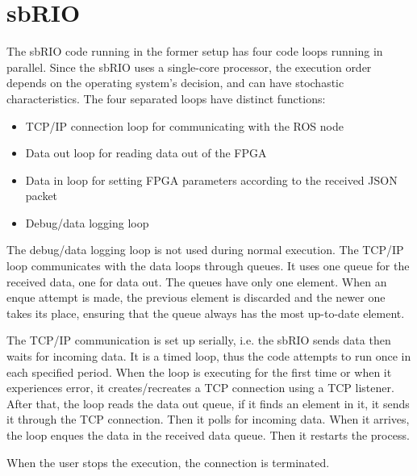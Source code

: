 \section{sbRIO}\label{sec:sbrio}

The sbRIO code running in the former setup has four code loops running in parallel. Since the sbRIO uses a single-core processor, the execution order depends on the operating system's decision, and can have stochastic characteristics. The four separated loops have distinct functions:

\begin{itemize}
	\item TCP/IP connection loop for communicating with the ROS node
	\item Data out loop for reading data out of the FPGA
	\item Data in loop for setting FPGA parameters according to the received JSON packet
	\item Debug/data logging loop
\end{itemize}

The debug/data logging loop is not used during normal execution. The TCP/IP loop communicates with the data loops through queues. It uses one queue for the received data, one for data out. The queues have only one element. When an enque attempt is made, the previous element is discarded and the newer one takes its place, ensuring that the queue always has the most up-to-date element.

The TCP/IP communication is set up serially, i.e. the sbRIO sends data then waits for incoming data. It is a timed loop, thus the code attempts to run once in each specified period. When the loop is executing for the first time or when it experiences error, it creates/recreates a TCP connection using a TCP listener. After that, the loop reads the data out queue, if it finds an element in it, it sends it through the TCP connection. Then it polls for incoming data. When it arrives, the loop enques the data in the received data queue. Then it restarts the process.

When the user stops the execution, the connection is terminated.